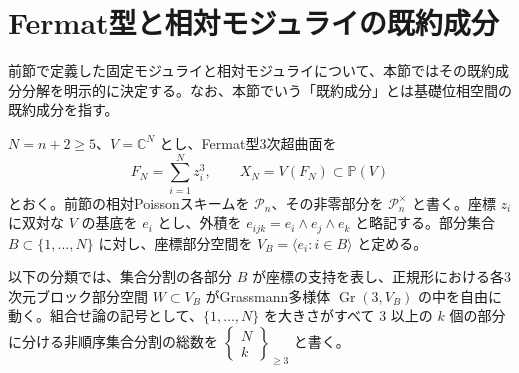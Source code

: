 \section{Fermat型と相対モジュライの既約成分}
\label{sec:pg-fermat-relative-components}

前節で定義した固定モジュライと相対モジュライについて、本節ではその既約成分分解を明示的に決定する。なお、本節でいう「既約成分」とは基礎位相空間の既約成分を指す。

$N=n+2\ge5$、$V=\mathbb C^N$ とし、Fermat型3次超曲面を
\begin{equation}
  F_N=\sum_{i=1}^Nz_i^3,\qquad
  X_N=V(F_N)\subset\mathbb P(V)
\end{equation}
とおく。前節の相対Poissonスキームを $\mathscr P_n$、その非零部分を $\mathscr P_n^\times$ と書く。座標 $z_i$ に双対な $V$ の基底を $e_i$ とし、外積を $e_{ijk}=e_i\wedge e_j\wedge e_k$ と略記する。部分集合 $B\subset\{1,\ldots,N\}$ に対し、座標部分空間を $V_B=\langle e_i:i\in B\rangle$ と定める。

以下の分類では、集合分割の各部分 $B$ が座標の支持を表し、正規形における各3次元ブロック部分空間 $W\subset V_B$ がGrassmann多様体 $\operatorname{Gr}(3,V_B)$ の中を自由に動く。組合せ論の記号として、$\{1,\ldots,N\}$ を大きさがすべて $3$ 以上の $k$ 個の部分に分ける非順序集合分割の総数を $\left\{\begin{smallmatrix}N\\k\end{smallmatrix}\right\}_{\ge3}$ と書く。

